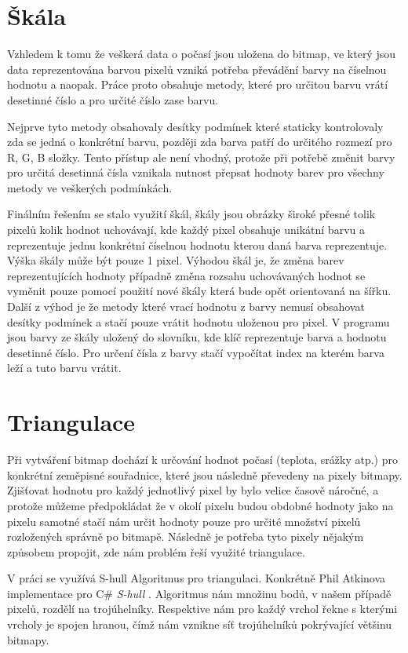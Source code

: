 \documentclass[czech,bachelor,dept460,male,csharp,cpdeclaration]{diploma}
\begin{document}
	\section{Škála}
	
	Vzhledem k tomu že veškerá data o počasí jsou uložena do bitmap, ve který jsou data reprezentována barvou pixelů vzniká potřeba převádění barvy na číselnou hodnotu a naopak. Práce proto obsahuje metody, které pro určitou barvu vrátí desetinné číslo a pro určité číslo zase barvu.
	
	Nejprve tyto metody obsahovaly desítky podmínek které staticky kontrolovaly zda se jedná o konkrétní barvu, později zda barva patří do určitého rozmezí pro R, G, B složky. Tento přístup ale není vhodný, protože při potřebě změnit barvy pro určitá desetinná čísla vznikala nutnost přepsat hodnoty barev pro všechny metody ve veškerých podmínkách.
	
	Finálním řešením se stalo využití škál, škály jsou obrázky široké přesné tolik pixelů kolik hodnot uchovávají, kde každý pixel obsahuje unikátní barvu a reprezentuje jednu konkrétní číselnou hodnotu kterou daná barva reprezentuje. Výška škály může být pouze 1 pixel. Výhodou škál je, že změna barev reprezentujících hodnoty případně změna rozsahu uchovávaných hodnot se vyměnit pouze pomocí použití nové škály která bude opět orientovaná na šířku. Další z výhod je že metody které vrací hodnotu z barvy nemusí obsahovat desítky podmínek a stačí pouze vrátit hodnotu uloženou pro pixel. V programu jsou barvy ze škály uložený do slovníku, kde klíč reprezentuje barva a hodnotu desetinné číslo. Pro určení čísla z barvy stačí vypočítat index na kterém barva leží a tuto barvu vrátit.
	
	\section{Triangulace}
	
	Při vytváření bitmap dochází k určování hodnot počasí (teplota, srážky atp.) pro konkrétní zeměpisné souřadnice, které jsou následně převedeny na pixely bitmapy. Zjišťovat hodnotu pro každý jednotlivý pixel by bylo velice časově náročné, a protože můžeme předpokládat že v okolí pixelu budou obdobné hodnoty jako na pixelu samotné stačí nám určit hodnoty pouze pro určité množství pixelů rozložených správně po bitmapě. Následně je potřeba tyto pixely nějakým způsobem propojit, zde nám problém řeší využité triangulace.
	
	V práci se využívá S-hull Algoritmus pro triangulaci. Konkrétně Phil Atkinova implementace pro C\# \emph{S-hull} \cite{shull}. Algoritmus nám množinu bodů, v našem případě pixelů, rozdělí na trojúhelníky. Respektive nám pro každý vrchol řekne s kterými vrcholy je spojen hranou, čímž nám vznikne síť trojúhelníků pokrývající většinu bitmapy.
	
\end{document}
